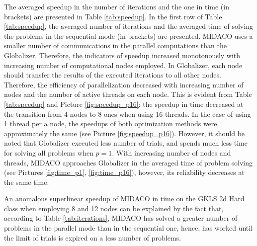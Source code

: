 \documentclass{svproc}
\begin{document}
The averaged speedup in the number of iterations and the one in time (in brackets) are presented in
Table \ref{tab:speedup}. In the first row of Table \ref{tab:speedup}, the averaged number of
iterations and the averaged time of solving the problems in the sequential mode (in brackets) are
presented. MIDACO uses a smaller number of communications in the parallel computations than the Globalizer.
Therefore, the indicators of speedup increased monotonously with increasing number of
computational nodes employed. In Globalizer, each node should transfer the results of the executed
iterations to all other nodes. Therefore, the efficiency of parallelization decreased with increasing
number of nodes and the number of active threads on each node. This is evident from Table
\ref{tab:speedup} and Picture \ref{fig:speedup_p16}: the speedup in time decreased at the transition from 4 nodes to 8 ones when
using 16 threads. In the case of using 1 thread per a node, the speedups of both optimization methods
were approximately the same (see Picture \ref{fig:speedup_p16}). However, it should be noted that Globalizer executed less number of
trials, and spends much less time for solving all problems when \(p=1\). With increasing number of
nodes and threads, MIDACO approaches Globalizer in the averaged time of problem solving (see Pictures \ref{fig:time_p1}, \ref{fig:time_p16}),
however, its reliability decreases at the same time.

An anomalous superlinear speedup of MIDACO in time on the GKLS 2d Hard class when
employing 8 and 12 nodes can be explained by the fact that, according to Table \ref{tab:iterations},
MIDACO has solved a greater number of problems in the parallel mode than in the sequential one,
hence, has worked until the limit of trials is expired on a less number of problems.
\end{document}

